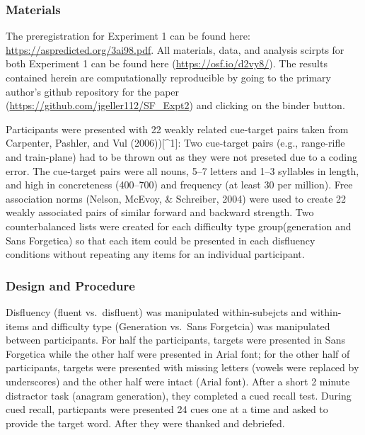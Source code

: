 \documentclass[english,pdf]{apa6}
\begin{document}
\hypertarget{materials}{%
\subsubsection{Materials}\label{materials}}

The preregistration for Experiment 1 can be found here: \url{https://aspredicted.org/3ai98.pdf}. All materials, data, and analysis scirpts for both Experiment 1 can be found here (\url{https://osf.io/d2vy8/}). The results contained herein are computationally reproducible by going to the primary author's github repository for the paper (\url{https://github.com/jgeller112/SF_Expt2}) and clicking on the binder button.

Participants were presented with 22 weakly related cue-target pairs taken from Carpenter, Pashler, and Vul (2006)){[}\^{}1{]}: Two cue-target pairs (e.g., range-rifle and train-plane) had to be thrown out as they were not preseted due to a coding error. The cue-target pairs were all nouns, 5--7 letters and 1--3 syllables in length, and high in concreteness (400--700) and frequency (at least 30 per million). Free association norms (Nelson, McEvoy, \& Schreiber, 2004) were used to create 22 weakly associated pairs of similar forward and backward strength. Two counterbalanced lists were created for each difficulty type group(generation and Sans Forgetica) so that each item could be presented in each disfluency conditions without repeating any items for an individual participant.

\hypertarget{design-and-procedure}{%
\subsubsection{Design and Procedure}\label{design-and-procedure}}

Disfluency (fluent vs.~disfluent) was manipulated within-subejcts and within-items and difficulty type (Generation vs.~Sans Forgetcia) was manipulated between participants. For half the participants, targets were presented in Sans Forgetica while the other half were presented in Arial font; for the other half of participants, targets were presented with missing letters (vowels were replaced by underscores) and the other half were intact (Arial font). After a short 2 minute distractor task (anagram generation), they completed a cued recall test. During cued recall, particpants were presented 24 cues one at a time and asked to provide the target word. After they were thanked and debriefed.
\end{document}
